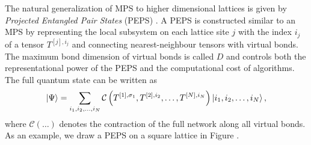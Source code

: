 The natural generalization of MPS to higher dimensional lattices is given by \textit{Projected Entangled Pair States} (PEPS) \cite{cite:algorithms_for_finite_PEPS, cite:mps_and_peps_concepts_symmetries_theorems}. A PEPS is constructed similar to an MPS by representing the local subsystem on each lattice site $j$ with the index $i_j$ of a tensor $T^{[j],i_j}$ and connecting nearest-neighbour tensors with virtual bonds. The maximum bond dimension of virtual bonds is called $D$ and controls both the representational power of the PEPS and the computational cost of algorithms. The full quantum state can be written as
\begin{equation}
	\label{eq:PEPS_definition_general}
	\ket{\Psi} = \sum_{i_1,i_2,\dots,i_N} \mathcal{C}\left(T^{[1],\sigma_1}, T^{[2],i_2}, \dots, T^{[N],i_N}\right) \ket{i_1,i_2,\dots,i_N},
\end{equation}
where $\mathcal{C}(\dots)$ denotes the contraction of the full network along all virtual bonds. As an example, we draw a PEPS on a square lattice in Figure . \par
